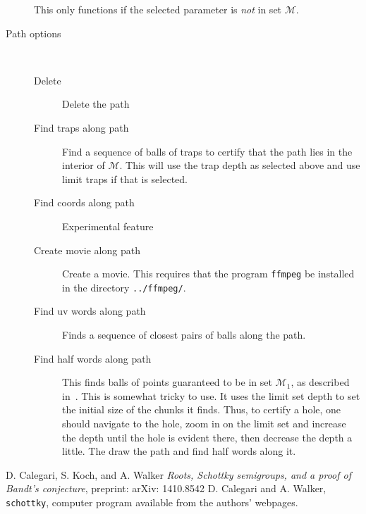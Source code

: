 \documentclass{amsart}
\begin{document}
\begin{description}
This only functions if the selected parameter is \emph{not} in set $\mathcal{M}$.
\vspace{5mm}
\item[Path options] ~
\begin{description}
\item[Delete] Delete the path
\item[Find traps along path] Find a sequence of balls of traps to certify that the 
path lies in the interior of $\mathcal{M}$.  This will use the trap depth 
as selected above and use limit traps if that is selected.
\item[Find coords along path] Experimental feature
\item[Create movie along path] Create a movie.  This requires that the 
program \texttt{ffmpeg} be installed in the directory \texttt{../ffmpeg/}.
\item[Find uv words along path] Finds a sequence of closest pairs of balls 
along the path.
\item[Find half words along path] This finds balls of points guaranteed to be in 
set $\mathcal{M}_1$, as described in~\cite{paper}.  This is somewhat tricky to use.
It uses the limit set depth to set the initial size of the chunks it finds.
Thus, to certify a hole, one should navigate to the hole, zoom in on the limit set 
and increase the depth until the hole is evident there, then decrease the depth a little.
The draw the path and find half words along it.
\end{description}
\end{description}


\begin{thebibliography}{99}
	D. Calegari, S. Koch, and A. Walker
	\emph{Roots, Schottky semigroups, and a proof of Bandt's conjecture},
	preprint: arXiv: 1410.8542
    D. Calegari and A. Walker,
    \texttt{schottky}, computer program available from the authors' webpages.
\end{thebibliography}
\end{document}
